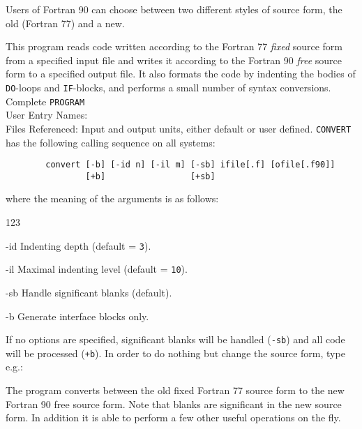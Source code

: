                        
                      
\Submitter{}                              
Users of Fortran 90 can choose between two different
styles of source form, the old (Fortran 77) and a new.
 
This program reads code written according to the
Fortran 77 {\em fixed} source form
from a specified input file
and writes it according to
the Fortran 90 {\em free} source form
to a specified output file.
It also formats the code by indenting the bodies of \texttt{DO}-loops
and \texttt{IF}-blocks, and performs a small number of syntax conversions.
\Structure
Complete {\tt PROGRAM}\\
User Entry Names: \\
Files Referenced: Input and output units, either default or user defined.
\Usage
{\tt CONVERT} has the following calling sequence on all systems:
\begin{verbatim}
        convert [-b] [-id n] [-il m] [-sb] ifile[.f] [ofile[.f90]]
                [+b]                 [+sb]
\end{verbatim}
where the meaning of the arguments is as follows:
\begin{DLtt}{123}
\item[-id] Indenting depth   (default = \texttt{3}).
\item[-il] Maximal indenting level   (default = \texttt{10}).
\item[-sb] Handle significant blanks (default).
\item[-b]  Generate interface blocks only.
\end{DLtt}
If no options are specified, significant blanks will be handled
(\texttt{-sb}) and all code will be processed (\texttt{+b}).
In order to do nothing but change the source form, type e.g.:
 
\begin{quote}
\end{quote}
 
\Method
 
The program converts between the old fixed Fortran 77 source form
to the new Fortran 90 free source form.
Note that blanks are significant in the new source form.
In addition it is able to perform a few other useful operations
on the fly.
 
